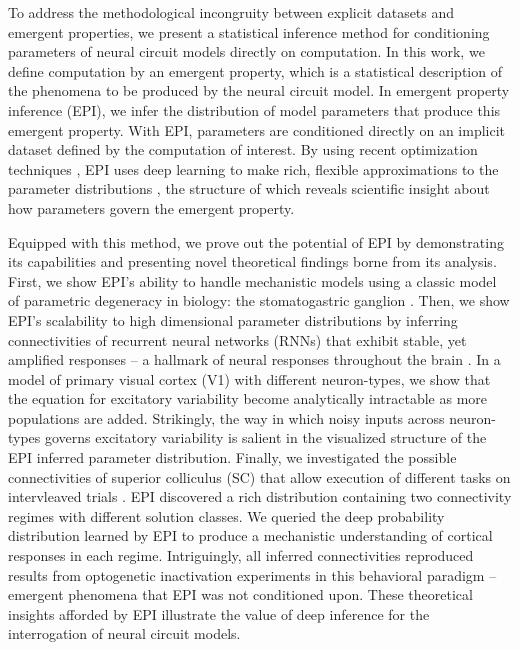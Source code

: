 \documentclass[11pt]{article}
\begin{document}
To address the methodological incongruity between explicit datasets and emergent properties, we present a statistical inference method for conditioning parameters of neural circuit models directly on computation.
In this work, we define computation by an emergent property, which is a statistical description of the phenomena to be produced by the neural circuit model.
In emergent property inference (EPI), we infer the distribution of model parameters that produce this emergent property.
With EPI, parameters are conditioned directly on an implicit dataset defined by the computation of interest.
By using recent optimization techniques \cite{loaiza2017maximum}, EPI uses deep learning to make rich, flexible approximations to the parameter distributions \cite{rezende2015variational}, the structure of which reveals scientific insight about how parameters govern the emergent property.


Equipped with this method, we prove out the potential of EPI by demonstrating its capabilities and presenting novel theoretical findings borne from its analysis.
First, we show EPI's ability to handle mechanistic models using a classic model of parametric degeneracy in biology: the stomatogastric ganglion \cite{goldman2001global, gutierrez2013multiple}.
Then, we show EPI's scalability to high dimensional parameter distributions by inferring connectivities of recurrent neural networks (RNNs) that exhibit stable, yet amplified responses -- a hallmark of neural responses throughout the brain \cite{murphy2009balanced, hennequin2014optimal, bondanelli2019population}.
In a model of primary visual cortex (V1) \cite{litwin2016inhibitory, palmigiano2020structure} with different neuron-types, we show that the equation for excitatory variability become analytically intractable as more populations are added.
Strikingly, the way in which noisy inputs across neuron-types governs excitatory variability is salient in the visualized structure of the EPI inferred parameter distribution.
Finally, we investigated the possible connectivities of superior colliculus (SC) that allow execution of different tasks on intervleaved trials \cite{duan2018collicular}.
EPI discovered a rich distribution containing two connectivity regimes with different solution classes.
We queried the deep probability distribution learned by EPI to produce a mechanistic understanding of cortical responses in each regime. 
Intriguingly, all inferred connectivities reproduced results from optogenetic inactivation experiments in this behavioral paradigm -- emergent phenomena that EPI was not conditioned upon.
These theoretical insights afforded by EPI illustrate the value of deep inference for the interrogation of neural circuit models.
\end{document}
